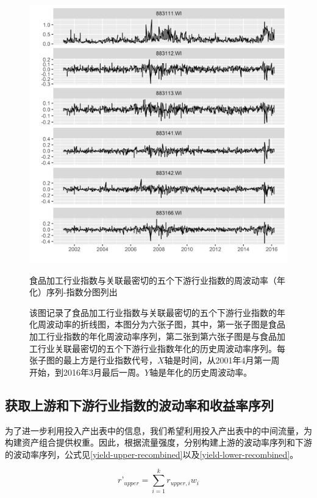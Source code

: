 \documentclass{sysuthesis}
\begin{document}
  \begin{figure}[htbp]
  \centering
  \includegraphics[scale=0.8]{image/883111-topk-lower-plus-one-weeklyvol-single.png}
  \caption{食品加工行业指数与关联最密切的五个下游行业指数的周波动率（年化）序列-指数分图列出}
  \caption*{\footnotesize 该图记录了食品加工行业指数与关联最密切的五个下游行业指数的年化周波动率的折线图，本图分为六张子图，其中，第一张子图是食品加工行业指数的年化周波动率序列，第二张到第六张子图是与食品加工行业关联最密切的五个下游行业指数年化的历史周波动率序列。每张子图的最上方是行业指数代号，$X$轴是时间，从2001年4月第一周开始，到2016年3月最后一周。$Y$轴是年化的历史周波动率。}
  \label{fig:883111-topk-lower-plus-one-weeklyvol-single}
  \end{figure}

\subsection{获取上游和下游行业指数的波动率和收益率序列}
为了进一步利用投入产出表中的信息，我们希望利用投入产出表中的中间流量，为构建资产组合提供权重。因此，根据流量强度，分别构建上游的波动率序列和下游的波动率序列，公式见\ref{yield-upper-recombined}以及\ref{yield-lower-recombined}。

\begin{equation}
\label{yield-upper-recombined} 
{r’_{upper}} = \sum\limits_{i = 1}^k {{r_{upper,i}}{w_i}} 
\end{equation}
\end{document}
